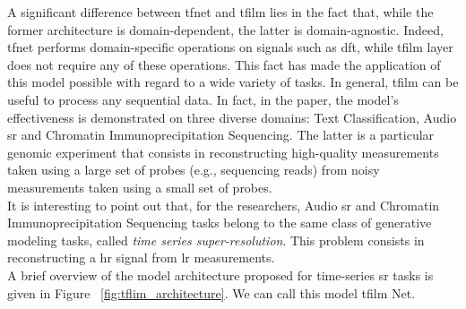 \noindent A significant difference between \gls{tfnet} and \gls{tfilm} lies in the fact that, while the former architecture is domain-dependent, the latter is domain-agnostic. Indeed, \gls{tfnet} performs domain-specific operations on signals such as \gls{dft}, while \gls{tfilm} layer does not require any of these operations. This fact has made the application of this model possible with regard to a wide variety of tasks. In general, \gls{tfilm} can be useful to process any sequential data. In fact, in the paper, the model’s effectiveness is demonstrated on three diverse domains: Text Classification, Audio \gls{sr} and Chromatin Immunoprecipitation Sequencing. The latter is a particular genomic experiment that consists in reconstructing high-quality measurements taken using a large set of probes (e.g., sequencing reads) from noisy measurements taken using a small set of probes. \\
It is interesting to point out that, for the researchers, Audio \gls{sr} and Chromatin Immunoprecipitation Sequencing tasks belong to the same class of generative modeling tasks, called \textit{time series super-resolution}. This problem consists in reconstructing a \gls{hr} signal from \gls{lr} measurements. \\
A brief overview of the model architecture proposed for time-series \gls{sr} tasks is given in Figure ~\ref{fig:tflim_architecture}. We can call this model \gls{tfilm} Net. \\

